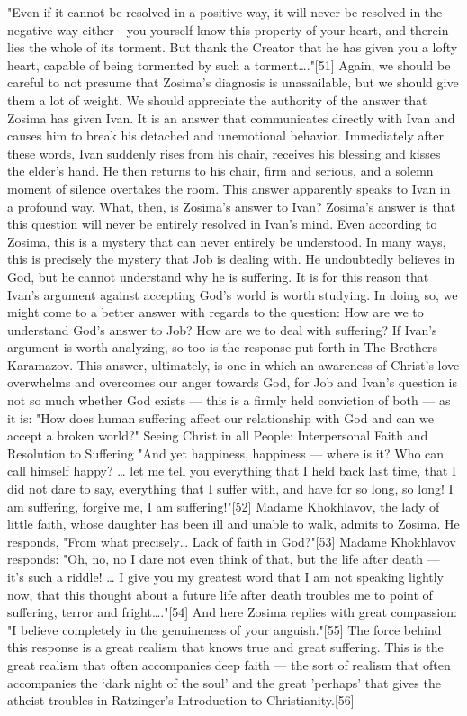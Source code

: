 "Even if it cannot be resolved in a positive way, it will never be resolved in the negative way either—you yourself know this property of your heart, and therein lies the whole of its torment. But thank the Creator that he has given you a lofty heart, capable of being tormented by such a torment…."[51] Again, we should be careful to not presume that Zosima's diagnosis is unassailable, but we should give them a lot of weight. We should appreciate the authority of the answer that Zosima has given Ivan. It is an answer that communicates directly with Ivan and causes him to break his detached and unemotional behavior. Immediately after these words, Ivan suddenly rises from his chair, receives his blessing and kisses the elder's hand. He then returns to his chair, firm and serious, and a solemn moment of silence overtakes the room. This answer apparently speaks to Ivan in a profound way.
What, then, is Zosima's answer to Ivan? Zosima's answer is that this question will never be entirely resolved in Ivan's mind. Even according to Zosima, this is a mystery that can never entirely be understood. In many ways, this is precisely the mystery that Job is dealing with. He undoubtedly believes in God, but he cannot understand why he is suffering. It is for this reason that Ivan's argument against accepting God's world is worth studying. In doing so, we might come to a better answer with regards to the question: How are we to understand God's answer to Job? How are we to deal with suffering? If Ivan's argument is worth analyzing, so too is the response put forth in The Brothers Karamazov. This answer, ultimately, is one in which an awareness of Christ's love overwhelms and overcomes our anger towards God, for Job and Ivan's question is not so much whether God exists — this is a firmly held conviction of both — as it is: "How does human suffering affect our relationship with God and can we accept a broken world?"        
Seeing Christ in all People: Interpersonal Faith and Resolution to Suffering
"And yet happiness, happiness — where is it? Who can call himself happy? … let me tell you everything that I held back last time, that I did not dare to say, everything that I suffer with, and have for so long, so long! I am suffering, forgive me, I am suffering!"[52] Madame Khokhlavov, the lady of little faith, whose daughter has been ill and unable to walk, admits to Zosima. He responds, "From what precisely… Lack of faith in God?"[53]
Madame Khokhlavov responds: "Oh, no, no I dare not even think of that, but the life after death — it's such a riddle! … I give you my greatest word that I am not speaking lightly now, that this thought about a future life after death troubles me to point of suffering, terror and fright…."[54] And here Zosima replies with great compassion: "I believe completely in the genuineness of your anguish."[55] The force behind this response is a great realism that knows true and great suffering. This is the great realism that often accompanies deep faith — the sort of realism that often accompanies the ‘dark night of the soul’ and the great 'perhaps' that gives the atheist troubles in Ratzinger's Introduction to Christianity.[56] 

